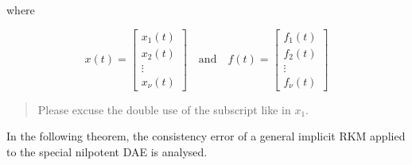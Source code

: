 \documentclass[]{book}
\newenvironment {JHSAYS} [0] {\begin{quote}\color{jhsc}} {\end{quote}}
\theoremstyle{definition}
\theoremstyle{definition}
\theoremstyle{definition}
\theoremstyle{definition}
\theoremstyle{remark}
\begin{document}
where

\[
 x(t) = \begin{bmatrix} x_1(t) \\ x_2(t) \\ \vdots \\ x_\nu(t) \end{bmatrix}
 \quad\text{and}\quad
 f(t) = \begin{bmatrix} f_1(t) \\ f_2(t) \\ \vdots \\ f_\nu(t) \end{bmatrix}
 \]

\begin{JHSAYS}
Please excuse the double use of the subscript like in \(x_1\).
\end{JHSAYS}

In the following theorem, the consistency error of a general implicit RKM applied to the special nilpotent DAE is analysed.
\end{document}
